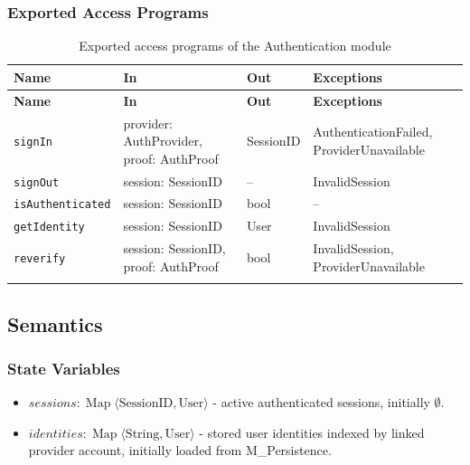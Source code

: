 \documentclass[12pt, titlepage]{article}
\begin{document}
\subsubsection{Exported Access Programs}

\begingroup
\small
\setlength{\tabcolsep}{4pt}
\renewcommand{\arraystretch}{1.2}
\begin{longtable}{>{\raggedright\arraybackslash}p{}
                  >{\raggedright\arraybackslash}p{}
                  >{\raggedright\arraybackslash}p{}
                  >{\raggedright\arraybackslash}p{}}
\toprule
\textbf{Name} & \textbf{In} & \textbf{Out} & \textbf{Exceptions} \\
\midrule
\endfirsthead
\toprule
\textbf{Name} & \textbf{In} & \textbf{Out} & \textbf{Exceptions} \\
\midrule
\endhead
\endfoot
\texttt{signIn} & provider: AuthProvider, proof: AuthProof & SessionID & AuthenticationFailed, ProviderUnavailable \\
\texttt{signOut} & session: SessionID & -- & InvalidSession \\
\texttt{isAuthenticated} & session: SessionID & bool & -- \\
\texttt{getIdentity} & session: SessionID & User & InvalidSession \\
\texttt{reverify} & session: SessionID, proof: AuthProof & bool & InvalidSession, ProviderUnavailable \\
\bottomrule
\caption{Exported access programs of the Authentication module}
\label{TblAuthenticationAccessPrograms}
\end{longtable}
\endgroup

\subsection{Semantics}

\subsubsection{State Variables}

\begin{itemize}
    \item $\mathit{sessions}:\operatorname{Map}\langle\text{SessionID},\text{User}\rangle$ - active authenticated sessions, initially $\emptyset$.

    \item $\mathit{identities}:\operatorname{Map}\langle\text{String},\text{User}\rangle$ - stored user identities indexed by linked provider account, initially loaded from M\_Persistence.
\end{itemize}
\end{document}
